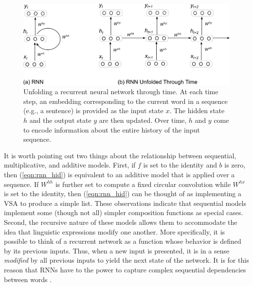 \begin{figure}
\centering
	\includegraphics[width=5in]{figures/rnn.png}
	\caption{Unfolding a recurrent neural network through time. At each time step, an embedding corresponding to the current word in a sequence (e.g., a sentence) is provided as the input state $x$. The hidden state $h$ and the output state $y$ are then updated. Over time, $h$ and $y$ come to encode information about the entire history of the input sequence.}\label{fig:rnn}
\end{figure}

It is worth pointing out two things about the relationship between sequential, multiplicative, and additive models. First, if $f$ is set to the identity and $b$ is zero, then (\ref{eqn:rnn_hid}) is equivalent to an additive model that is applied over a sequence. If $W^{hh}$ is further set to compute a fixed circular convolution while $W^{hx}$ is set to the identity, then (\ref{eqn:rnn_hid}) can be thought of as implementing a VSA to produce a simple list. These observations indicate that sequential models implement some (though not all) simpler composition functions as special cases. Second, the recursive nature of these models allows them to accommodate the idea that linguistic expressions modify one another. More specifically, it is possible to think of a recurrent network as a function whose behavior is defined by its previous inputs. Thus, when a new input is presented, it is in a sense \textit{modified} by all previous inputs to yield the next state of the network. It is for this reason that RNNs have to the power to capture complex sequential dependencies between words \citep{Elman:1991,Sutskever:2014}.

